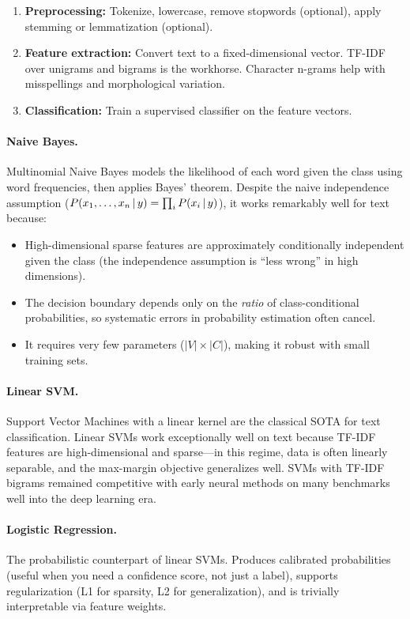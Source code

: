 \begin{enumerate}[label=\textbf{Step \arabic*.}]
    \item \textbf{Preprocessing:} Tokenize, lowercase, remove stopwords (optional),
          apply stemming or lemmatization (optional).
    \item \textbf{Feature extraction:} Convert text to a fixed-dimensional vector.
          TF-IDF over unigrams and bigrams is the workhorse.  Character n-grams
          help with misspellings and morphological variation.
    \item \textbf{Classification:} Train a supervised classifier on the feature vectors.
\end{enumerate}

\paragraph{Naive Bayes.}
Multinomial Naive Bayes models the likelihood of each word given the class using word
frequencies, then applies Bayes' theorem.  Despite the naive independence assumption
($P(x_1, \ldots, x_n \,|\, y) = \prod_i P(x_i \,|\, y)$), it works remarkably well for
text because:
\begin{itemize}
    \item High-dimensional sparse features are approximately conditionally independent given
          the class (the independence assumption is ``less wrong'' in high dimensions).
    \item The decision boundary depends only on the \emph{ratio} of class-conditional
          probabilities, so systematic errors in probability estimation often cancel.
    \item It requires very few parameters ($|V| \times |C|$), making it robust with small
          training sets.
\end{itemize}

\paragraph{Linear SVM.}
Support Vector Machines with a linear kernel are the classical SOTA for text classification.
Linear SVMs work exceptionally well on text because TF-IDF features are high-dimensional and
sparse---in this regime, data is often linearly separable, and the max-margin objective
generalizes well.  SVMs with TF-IDF bigrams remained competitive with early neural methods
on many benchmarks well into the deep learning era.

\paragraph{Logistic Regression.}
The probabilistic counterpart of linear SVMs.  Produces calibrated probabilities (useful when
you need a confidence score, not just a label), supports regularization (L1 for sparsity, L2
for generalization), and is trivially interpretable via feature weights.

